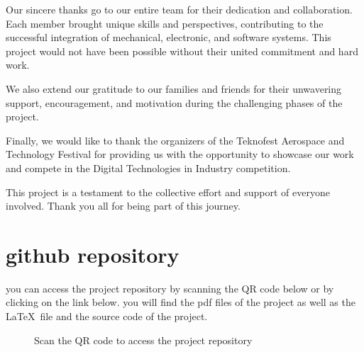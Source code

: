 \documentclass[main]{subfiles}
\begin{document}
Our sincere thanks go to our entire team for their dedication and collaboration. Each member brought unique skills and perspectives, contributing to the successful integration of mechanical, electronic, and software systems. This project would not have been possible without their united commitment and hard work.

We also extend our gratitude to our families and friends for their unwavering support, encouragement, and motivation during the challenging phases of the project.

Finally, we would like to thank the organizers of the Teknofest Aerospace and Technology Festival for providing us with the opportunity to showcase our work and compete in the Digital Technologies in Industry competition.

This project is a testament to the collective effort and support of everyone involved. Thank you all for being part of this journey.
\newpage
\centering
\section*{\hfill github repository \hfill}
\justifying %
you can access the project repository by scanning the QR code below or by clicking on the link below.
you will find the pdf files of the project as well as the \LaTeX \ file and the source code of the project.

\begin{figure}[h]
    \centering
    \caption*{Scan the QR code to access the project repository}
\end{figure}
    \newpage
\centering
\end{document}
